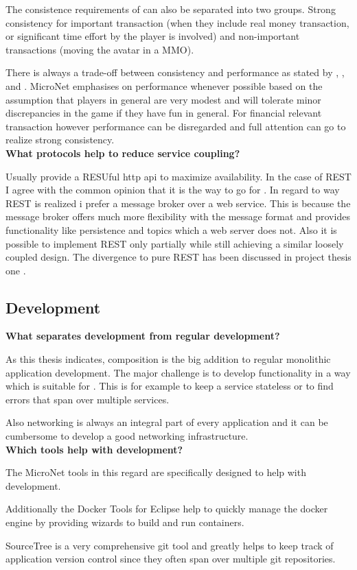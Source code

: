 The consistence requirements of \ogs{} can also be separated into two groups.
Strong consistency for important transaction (when they include real money
transaction, or significant time effort by the player is involved) and
non-important transactions (moving the avatar in a MMO).

There is always a trade-off between consistency and performance as stated by
\cite{wada2011data}, \cite{olston2000offering}, and
\cite{franklin1997transactional}. MicroNet emphasises on performance whenever
possible based on the assumption that players in general are very modest and
will tolerate minor discrepancies in the game if they have fun in general. For
financial relevant transaction however performance can be disregarded and full
attention can go to realize strong consistency.\\

\noindent
\textbf{What protocols help to reduce service coupling?}

Usually \ms{} provide a RESUful \gls{http} \gls{api} to maximize availability.
In the case of REST I agree with the common opinion that it is the way to go for
\mss{}. In regard to way REST is realized i prefer a message broker over a web
service. This is because the message broker offers much more flexibility with
the message format and provides functionality like persistence and topics which
a web server does not. Also it is possible to implement REST only partially
while still achieving a similar loosely coupled design. The divergence to pure
REST has been discussed in project thesis one .\\

\subsection{\ms{} Development}

\noindent
\textbf{What separates \ms{} development from regular development?}

As this thesis indicates, \ms{} composition is the big addition to regular
monolithic application development. The major challenge is to develop
functionality in a way which is suitable for \ms{}. This is for example to keep
a service stateless or to find errors that span over multiple services. 

Also networking is always an integral part of every \ms{} application and it
can be cumbersome to develop a good networking infrastructure.\\

\noindent
\textbf{Which tools help with \ms{} development?}

The MicroNet tools in this regard are specifically designed to help with \ms{}
development. 

Additionally the Docker Tools for Eclipse help to quickly manage
the docker engine by providing wizards to build and run containers. 

SourceTree is a very comprehensive git tool and greatly helps to keep track of
\ms{} application version control since they often span over multiple git
repositories.


